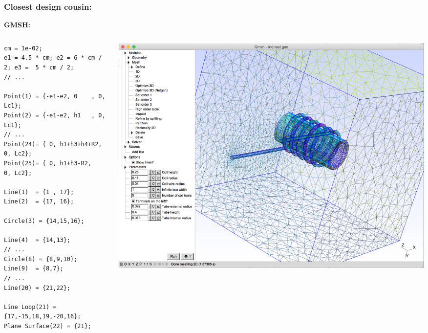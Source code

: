 \documentclass{beamer}
\theoremstyle{plain}
\theoremstyle{definition}
\begin{document}

\begin{frame}[fragile]
\frametitle{Closest design cousin:}
\textbf{GMSH:}
\begin{columns}
    \begin{column}{.50\linewidth}
        \begin{listing}[H]
            \tiny
            \begin{verbatim}
cm = 1e-02;
e1 = 4.5 * cm; e2 = 6 * cm / 2; e3 =  5 * cm / 2;
// ...

Point(1) = {-e1-e2, 0    , 0, Lc1};
Point(2) = {-e1-e2, h1   , 0, Lc1};
// ...
Point(24)= { 0, h1+h3+h4+R2, 0, Lc2};
Point(25)= { 0, h1+h3-R2,    0, Lc2};

Line(1)  = {1 , 17};
Line(2)  = {17, 16};

Circle(3) = {14,15,16};

Line(4)  = {14,13};
// ...
Circle(8) = {8,9,10};
Line(9)  = {8,7};
// ...
Line(20) = {21,22};

Line Loop(21) = {17,-15,18,19,-20,16};
Plane Surface(22) = {21};
            \end{verbatim}
        \end{listing}
    \end{column}
    \begin{column}{.45\linewidth}
        \includegraphics[width=\linewidth]{gmsh}
    \end{column}
\end{columns}


\end{frame}
\end{document}
